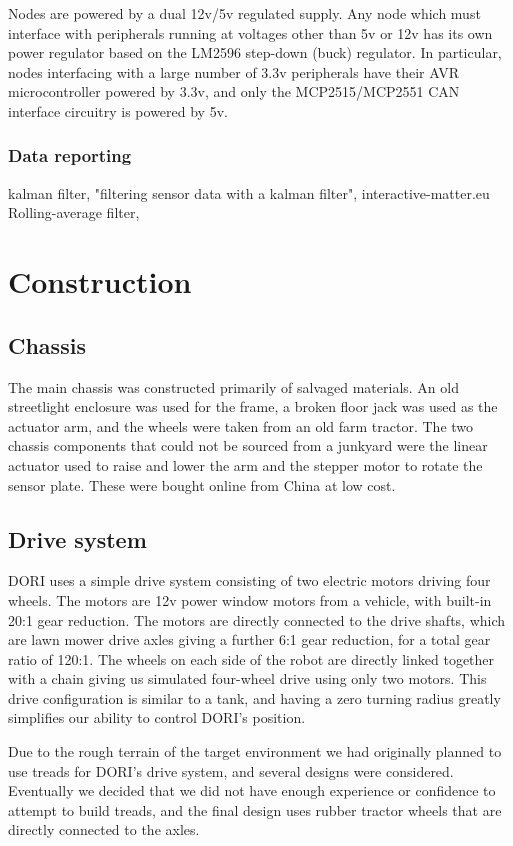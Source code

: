 \documentclass[12pt]{article}
\newcommand{\brand}{}
\begin{document}
        Nodes are powered by a dual 12v/5v regulated supply. Any node which must interface with peripherals running at voltages other than 5v or 12v has its own power regulator based on the LM2596 step-down (buck) regulator. In particular, nodes interfacing with a large number of 3.3v peripherals have their AVR microcontroller powered by 3.3v, and only the \brand{MCP2515/MCP2551} CAN interface circuitry is powered by 5v.

        \subsubsection{Data reporting}
kalman filter, "filtering sensor data with a kalman filter", interactive-matter.eu
Rolling-average filter, 
\section{Construction}
    \subsection{Chassis}
The main chassis was constructed primarily of salvaged materials. An old streetlight enclosure was used for the frame, a broken floor jack was used as the actuator arm, and the wheels were taken from an old farm tractor. The two chassis components that could not be sourced from a junkyard were the linear actuator used to raise and lower the arm and the stepper motor to rotate the sensor plate. These were bought online from China at low cost.

    \subsection{Drive system}
    DORI uses a simple drive system consisting of two electric motors driving four wheels. The motors are 12v power window motors from a vehicle, with built-in 20:1 gear reduction. The motors are directly connected to the drive shafts, which are lawn mower drive axles giving a further 6:1 gear reduction, for a total gear ratio of 120:1. The wheels on each side of the robot are directly linked together with a chain giving us simulated four-wheel drive using only two motors. This drive configuration is similar to a tank, and having a zero turning radius greatly simplifies our ability to control DORI's position.

    Due to the rough terrain of the target environment we had originally planned to use treads for DORI's drive system, and several designs were considered. Eventually we decided that we did not have enough experience or confidence to attempt to build treads, and the final design uses rubber tractor wheels that are directly connected to the axles.
\end{document}
